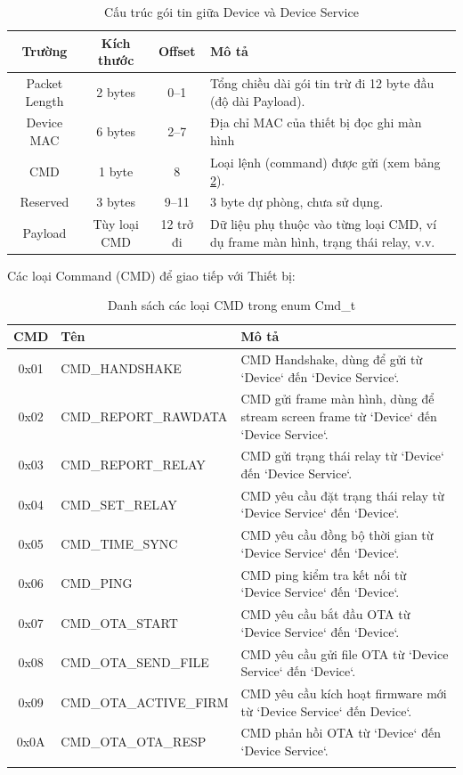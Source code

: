 \begin{table}[h!]
\centering
\begin{tabular}{|c|c|c|p{7cm}|}
\hline
\textbf{Trường} & \textbf{Kích thước} & \textbf{Offset} & \textbf{Mô tả} \\
\hline
Packet Length & 2 bytes & 0–1 & Tổng chiều dài gói tin trừ đi 12 byte đầu (độ dài Payload). \\
\hline
Device MAC & 6 bytes & 2–7 & Địa chỉ MAC của thiết bị đọc ghi màn hình \\
\hline
CMD & 1 byte & 8 & Loại lệnh (command) được gửi (xem bảng \ref{tab:cmd_list}). \\
\hline
Reserved & 3 bytes & 9–11 & 3 byte dự phòng, chưa sử dụng. \\
\hline
Payload & Tùy loại CMD & 12 trở đi & Dữ liệu phụ thuộc vào từng loại CMD, ví dụ frame màn hình, trạng thái relay, v.v. \\
\hline
\end{tabular}
\caption{Cấu trúc gói tin giữa Device và Device Service}
\label{tab:device-packet_structure}
\end{table}


Các loại Command (CMD) để giao tiếp với Thiết bị:

\begin{longtable}{|c|l|p{6cm}|}
\hline
\textbf{CMD} & \textbf{Tên} & \textbf{Mô tả} \\
\hline
\endfirsthead



0x01 & CMD\_HANDSHAKE & CMD Handshake, dùng để gửi từ `Device` đến `Device Service`. \\
\hline
0x02 & CMD\_REPORT\_RAWDATA & CMD gửi frame màn hình, dùng để stream screen frame từ `Device` đến `Device Service`. \\
\hline
0x03 & CMD\_REPORT\_RELAY & CMD gửi trạng thái relay từ `Device` đến `Device Service`. \\
\hline
0x04 & CMD\_SET\_RELAY & CMD yêu cầu đặt trạng thái relay từ `Device Service` đến `Device`. \\
\hline
0x05 & CMD\_TIME\_SYNC & CMD yêu cầu đồng bộ thời gian từ `Device Service` đến `Device`. \\
\hline
0x06 & CMD\_PING & CMD ping kiểm tra kết nối từ `Device Service` đến `Device`. \\
\hline
0x07 & CMD\_OTA\_START & CMD yêu cầu bắt đầu OTA từ `Device Service` đến `Device`. \\
\hline
0x08 & CMD\_OTA\_SEND\_FILE & CMD yêu cầu gửi file OTA từ `Device Service` đến `Device`. \\
\hline
0x09 & CMD\_OTA\_ACTIVE\_FIRM & CMD yêu cầu kích hoạt firmware mới từ `Device Service` đến Device`. \\
\hline
0x0A & CMD\_OTA\_OTA\_RESP & CMD phản hồi OTA từ `Device` đến `Device Service`. \\
\hline

\caption{Danh sách các loại CMD trong enum Cmd\_t}
\label{tab:cmd_list}
\end{longtable}



